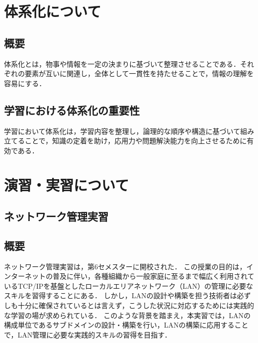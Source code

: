 \documentclass[12pt,a4j,titlepage]{ltjsarticle}
\begin{document}


\clearpage

\section{体系化について}
\subsection{概要}
体系化とは，物事や情報を一定の決まりに基づいて整理させることである．それぞれの要素が互いに関連し，全体として一貫性を持たせることで，情報の理解を容易にする．

\subsection{学習における体系化の重要性}
学習において体系化は，学習内容を整理し，論理的な順序や構造に基づいて組み立てることで，知識の定着を助け，応用力や問題解決能力を向上させるために有効である．





\section{演習・実習について}


\subsection{ネットワーク管理実習}
\subsection{概要}
ネットワーク管理実習は，第6セメスターに開校された．
この授業の目的は，インターネットの普及に伴い，各種組織から一般家庭に至るまで幅広く利用されているTCP/IPを基盤としたローカルエリアネットワーク（LAN）の管理に必要なスキルを習得することにある．
しかし，LANの設計や構築を担う技術者は必ずしも十分に確保されているとは言えず，こうした状況に対応するためには実践的な学習の場が求められている．
このような背景を踏まえ，本実習では，LANの構成単位であるサブドメインの設計・構築を行い，LANの構築に応用することで，LAN管理に必要な実践的スキルの習得を目指す．
\end{document}
